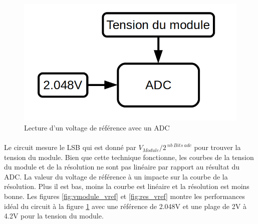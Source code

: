 	\begin{figure}[H]
		\centering
		\includegraphics[scale=0.3]{Images/Voltage_reference.png}
		\caption{Lecture d'un voltage de référence avec un ADC}
		\label{fig:adc_vref}
	\end{figure}
	
	\paragraph*{}
	Le circuit mesure le LSB qui est donné par $V_{Module} / 2^{~nb~Bits~adc}$ pour  trouver la tension du module. Bien que cette technique fonctionne, les courbes de la tension du module et de la résolution ne sont pas linéaire par rapport au résultat du ADC. La valeur du voltage de référence à un impacte sur la courbe de la résolution. Plus il est bas, moins la courbe est linéaire et la résolution est moins bonne. Les figures \ref{fig:vmodule_vref} et \ref{fig:res_vref} montre les performances idéal du circuit à la figure \ref{fig:adc_vref} avec une référence de 2.048V et une plage de 2V à 4.2V pour la tension du module.
	
